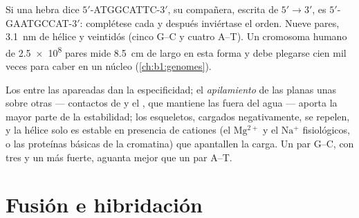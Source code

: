 \begin{example}\label{ex:b1:nucleic-acids:complement}
Si una hebra dice $5'$-ATGGCATTC-$3'$, su compañera, escrita de
$5' \to 3'$, es $5'$-GAATGCCAT-$3'$: complétese cada  y después
inviértase el orden. Nueve pares, \qty{3.1}{nm} de hélice y veintidós
 (cinco G--C y cuatro A--T). Un cromosoma humano de
\num{2.5e8} pares mide \qty{8.5}{cm} de largo en esta forma y debe plegarse
cien mil veces para caber en un núcleo (\cref{ch:b1:genomes}).
\end{example}

\begin{proposition}\label{prop:b1:nucleic-acids:stability}
Los  entre las  apareadas dan la especificidad; el
\emph{apilamiento} de las  planas unas
sobre otras --- contactos de  y el , que
mantiene las  fuera del agua --- aporta la mayor parte de la
estabilidad; los esqueletos, cargados negativamente, se repelen, y la hélice
solo es estable en presencia de cationes (el $\mathrm{Mg^{2+}}$ y el
$\mathrm{Na^+}$ fisiológicos, o las proteínas básicas de la cromatina) que
apantallen la carga. Un par G--C, con tres  y un
 más fuerte, aguanta mejor que un par A--T.
\end{proposition}

\section{Fusión e hibridación}

